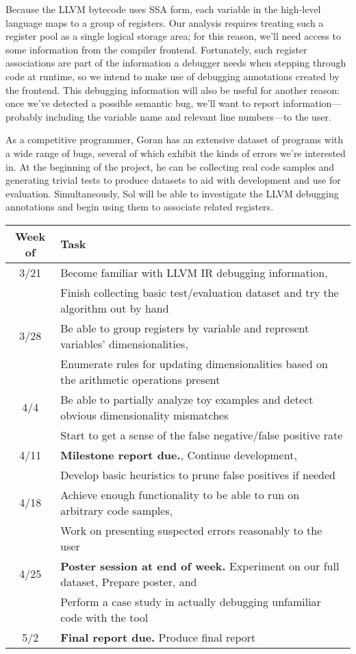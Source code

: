\documentclass[12pt]{article}
\begin{document}
Because the LLVM bytecode uses SSA form, each variable in the high-level language maps to a group of registers.
Our analysis requires treating such a register pool as a single logical storage area; for this reason, we'll need access to some information from the compiler frontend.
Fortunately, such register associations are part of the information a debugger needs when stepping through code at runtime, so we intend to make use of debugging annotations created by the frontend.
This debugging information will also be useful for another reason: once we've detected a possible semantic bug, we'll want to report information---probably including the variable name and relevant line numbers---to the user.

As a competitive programmer, Goran has an extensive dataset of programs with a wide range of bugs, several of which exhibit the kinds of errors we're interested in.
At the beginning of the project, he can be collecting real code samples and generating trivial tests to produce datasets to aid with development and use for evaluation.
Simultaneously, Sol will be able to investigate the LLVM debugging annotations and begin using them to associate related registers.

\begin{tabular}{c | l}
Week of & Task \\
\hline
3/21 & Become familiar with LLVM IR debugging information, \\
& Finish collecting basic test/evaluation dataset and try the algorithm out by hand \\
3/28 & Be able to group registers by variable and represent variables' dimensionalities, \\
& Enumerate rules for updating dimensionalities based on the arithmetic operations present \\
4/4 & Be able to partially analyze toy examples and detect obvious dimensionality mismatches \\
& Start to get a sense of the false negative/false positive rate \\
4/11 & \textbf{Milestone report due.}, Continue development, \\
& Develop basic heuristics to prune false positives if needed \\
4/18 & Achieve enough functionality to be able to run on arbitrary code samples, \\
& Work on presenting suspected errors reasonably to the user \\
4/25 & \textbf{Poster session at end of week.} Experiment on our full dataset, Prepare poster, and \\
& Perform a case study in actually debugging unfamiliar code with the tool \\
5/2 & \textbf{Final report due.} Produce final report
\end{tabular}
\end{document}
